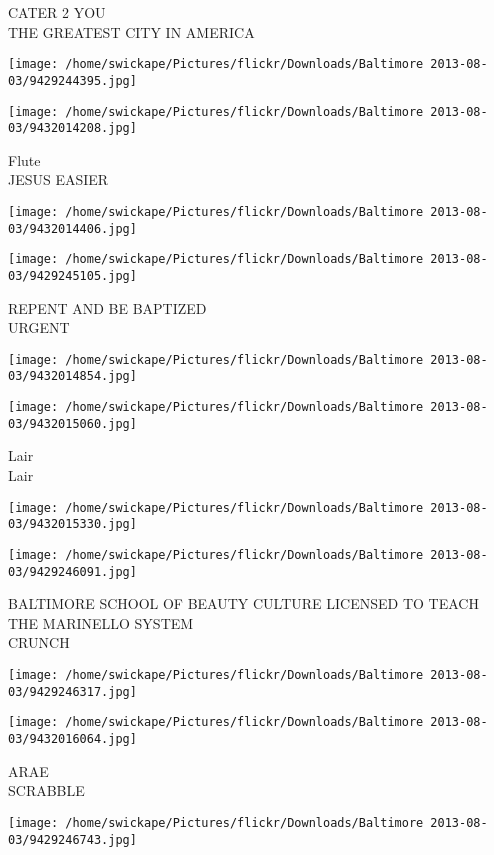 \documentclass[10pt,letterpaper]{article}
\begin{document}
CATER 2 YOU\\
THE GREATEST CITY IN AMERICA
\pagebreak

\texttt{[image: /home/swickape/Pictures/flickr/Downloads/Baltimore 2013-08-03/9429244395.jpg]}

\vspace{0.25in}
\texttt{[image: /home/swickape/Pictures/flickr/Downloads/Baltimore 2013-08-03/9432014208.jpg]}

Flute\\
JESUS EASIER
\pagebreak

\texttt{[image: /home/swickape/Pictures/flickr/Downloads/Baltimore 2013-08-03/9432014406.jpg]}

\vspace{0.25in}
\texttt{[image: /home/swickape/Pictures/flickr/Downloads/Baltimore 2013-08-03/9429245105.jpg]}

REPENT AND BE BAPTIZED\\
URGENT
\pagebreak

\texttt{[image: /home/swickape/Pictures/flickr/Downloads/Baltimore 2013-08-03/9432014854.jpg]}

\vspace{0.25in}
\texttt{[image: /home/swickape/Pictures/flickr/Downloads/Baltimore 2013-08-03/9432015060.jpg]}

Lair\\
Lair
\pagebreak

\texttt{[image: /home/swickape/Pictures/flickr/Downloads/Baltimore 2013-08-03/9432015330.jpg]}

\vspace{0.25in}
\texttt{[image: /home/swickape/Pictures/flickr/Downloads/Baltimore 2013-08-03/9429246091.jpg]}

BALTIMORE SCHOOL OF BEAUTY CULTURE LICENSED TO TEACH THE MARINELLO SYSTEM\\
CRUNCH
\pagebreak

\texttt{[image: /home/swickape/Pictures/flickr/Downloads/Baltimore 2013-08-03/9429246317.jpg]}

\vspace{0.25in}
\texttt{[image: /home/swickape/Pictures/flickr/Downloads/Baltimore 2013-08-03/9432016064.jpg]}

ARAE\\
SCRABBLE
\pagebreak

\texttt{[image: /home/swickape/Pictures/flickr/Downloads/Baltimore 2013-08-03/9429246743.jpg]}
\end{document}

